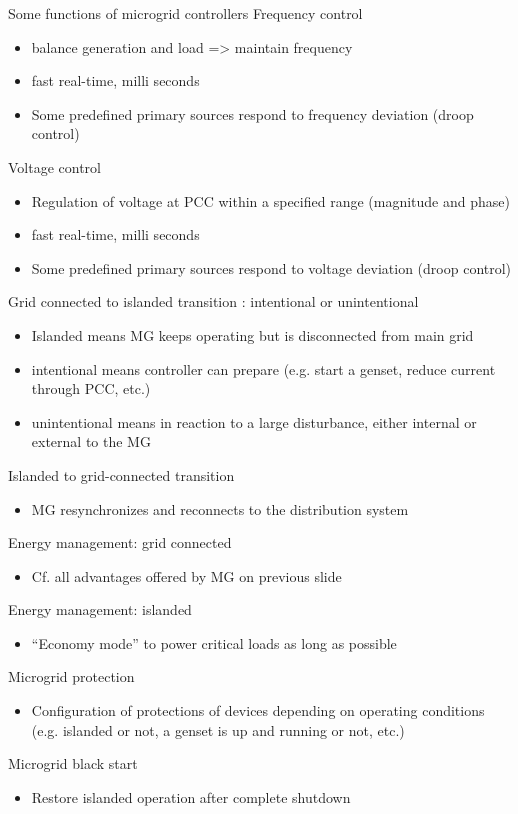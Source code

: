 \begin{frame}[allowframebreaks]{Some functions of microgrid controllers}
Frequency control
\begin{itemize}
  \item balance generation and load => maintain frequency
  \item fast real-time, milli seconds
  \item Some predefined primary sources respond to frequency deviation (droop control)
\end{itemize}
Voltage control
\begin{itemize}
  \item Regulation of voltage at PCC within a specified range (magnitude and phase)
  \item fast real-time, milli seconds
  \item Some predefined primary sources respond to voltage deviation (droop control)
\end{itemize}
Grid connected to islanded transition : intentional or unintentional
\begin{itemize}
  \item Islanded means MG keeps operating but is disconnected from main grid
  \item intentional means controller can prepare (e.g. start a genset, reduce current through PCC, etc.)
  \item unintentional means in reaction to a large disturbance, either internal or external to the MG
\end{itemize}
Islanded to grid-connected transition
\begin{itemize}
  \item MG resynchronizes and reconnects to the distribution system
\end{itemize}
Energy management: grid connected
\begin{itemize}
  \item Cf. all advantages offered by MG on previous slide
\end{itemize}
Energy management: islanded
\begin{itemize}
  \item “Economy mode” to power critical loads as long as possible
\end{itemize}
Microgrid protection
\begin{itemize}
  \item Configuration of protections of devices depending on operating conditions (e.g. islanded or not, a genset is up and running or not, etc.)
\end{itemize}
Microgrid black start
\begin{itemize}
  \item Restore islanded operation after complete shutdown
\end{itemize}
\end{frame}


